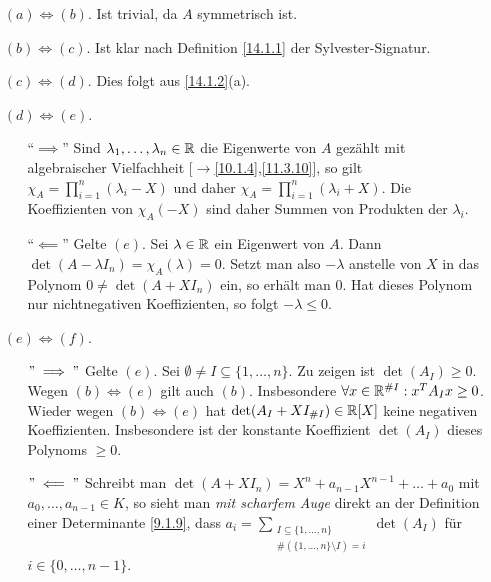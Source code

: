 \documentclass[../../main.tex]{subfiles}
\begin{document}
\begin{cproof}
    $\;$
    \begin{itemize}
        \item[$(a)\Longleftrightarrow(b)$.] Ist trivial, da $A$ symmetrisch ist.
        \item[$(b)\Longleftrightarrow(c)$.] Ist klar nach Definition \ref{14.1.1} der Sylvester-Signatur.
        \item[$(c)\Longleftrightarrow(d)$.] Dies folgt aus \ref{14.1.2}(a).
        \item[$(d)\Longleftrightarrow(e)$.] 
            $\;$
            \begin{itemize}
                \item[\enquote{$\implies$}] Sind $\lambda_1,\ldots ,\lambda_n\in \mathbb R$ die Eigenwerte von $A$ gezählt mit algebraischer Vielfachheit [$\to$\ref{10.1.4},\ref{11.3.10}], so gilt $\chi_A=\prod_{i=1}^n (\lambda_i-X)$ und daher $\chi_A=\prod_{i=1}^n (\lambda_i+X)$. Die Koeffizienten von $\chi_A(-X)$ sind daher Summen von Produkten der $\lambda_i$.
                \item[\enquote{$\impliedby$}] Gelte $(e)$. Sei $\lambda\in \mathbb R$ ein Eigenwert von $A$. Dann $\det(A-\lambda I_n)=\chi_A(\lambda)=0$. Setzt man also $-\lambda$ anstelle von $X$ in das Polynom $0\neq \det(A+XI_n)$ ein, so erhält man 0. Hat dieses Polynom nur nichtnegativen Koeffizienten, so folgt $-\lambda\le 0$.
            \end{itemize}
        \item[$(e)\Longleftrightarrow(f)$.]
            $\;$
            \begin{itemize}
                \item[$"\implies"$] Gelte $(e)$. Sei $\emptyset\neq I\subseteq\{1,\ldots ,n\}$. Zu zeigen ist $\det(A_I)\ge 0$. Wegen $(b)\Longleftrightarrow (e)$ gilt auch $(b)$. Insbesondere $\forall x\in \mathbb R^{\# I}: x^TA_Ix\ge 0$. Wieder wegen $(b)\Longleftrightarrow (e)$ hat $\det(A_I+XI_{\# I})\in \mathbb R[X]$ keine negativen Koeffizienten. Insbesondere ist der konstante Koeffizient $\det (A_I)$ dieses Polynoms $\ge 0$.
                \item[$"\impliedby"$] Schreibt man $\det(A+XI_n)=X^n+a_{n-1}X^{n-1}+\ldots +a_0$ mit $a_0,\ldots ,a_{n-1}\in K$, so sieht man \textit{mit scharfem Auge} direkt an der Definition einer Determinante \ref{9.1.9}, dass $a_i=\sum_{\substack{I\subseteq \{1,\ldots ,n\}\\\#(\{1,\ldots ,n\}\setminus I)=i}} \det(A_I)$ für $i\in\{0,\ldots ,n-1\}$.
            \end{itemize}

\end{itemize}
\end{cproof}
\end{document}
